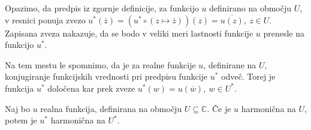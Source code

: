 \documentclass[mat1]{fmfdelo}
\begin{document}
    Opazimo, da predpis iz zgornje definicije, za funkcijo $u$ definirano na območju $U$, v resnici ponuja zvezo $u^*(\overline{z}) = (u^* \circ (z \mapsto \overline{z}))(z) = \overline{u(z)},~z \in U$.
    Zapisana zveza nakazuje, da se bodo v veliki meri lastnosti funkcije $u$ prenesle na funkcijo $u^*$.

    \begin{opomba}
        Na tem mestu le spomnimo, da je za realne funkcije $u$, definirane na $U$, konjugiranje funkcijskih vrednosti pri predpisu funkcije $u^*$ odveč. Torej je funkcija $u^*$ določena kar prek zveze $u^*(w) = u(\overline{w}),~w \in U^*$.
    \end{opomba}

    \begin{trditev}
        \label{lemaharm}
        Naj bo $u$ realna funkcija, definirana na območju $U \subseteq \mathbb{C}$. Če je $u$ harmonična na $U$, potem je $u^*$ harmonična na $U^*$. 
    \end{trditev}
\end{document}
